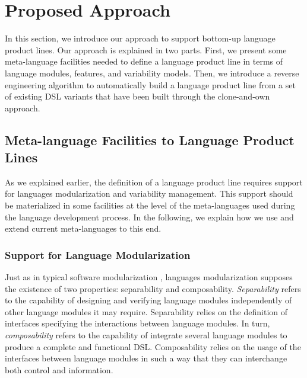 \section{Proposed Approach}
\label{sec:approach}

In this section, we introduce our approach to support bottom-up language product lines. Our approach is explained in two parts. First, we present some meta-language facilities needed to define a language product line in terms of language modules, features, and variability models. Then, we introduce a reverse engineering algorithm to automatically build a language product line from a set of existing DSL variants that have been built through the clone-and-own approach. 

\subsection{Meta-language Facilities to Language Product Lines}
\label{sec:meta-langauges}

As we explained earlier, the definition of a language product line requires support for languages modularization and variability management. This support should be materialized in some facilities at the level of the meta-languages used during the language development process. In the following, we explain how we use and extend current meta-languages to this end. 

\subsubsection{Support for Language Modularization}


Just as in typical software modularization \cite{Tripakis:2003}, languages modularization supposes the existence of two properties: separability and composability. \textit{Separability} refers to the capability of designing and verifying language modules independently of other language modules it may require. Separability relies on the definition of interfaces specifying the interactions between language modules. In turn, \textit{composability} refers to the capability of integrate several language modules to produce a complete and functional DSL. Composability relies on the usage of the interfaces between language modules in such a way that they can interchange both control and information.

